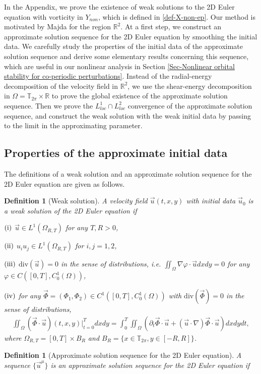 \documentclass[1 [leqno, 11pt]{amsart}
\numberwithin{equation}{section}
\newtheorem{definition}[Theorem]{Definition}
\begin{document}
\begin{CJK*}{GBK}{song}
\begin{appendix}
In the Appendix, we prove the existence of weak solutions to the 2D Euler equation with vorticity  in $Y_{non}$, which is defined in \eqref{def-X-non-ep}.
Our method is motivated by Majda \cite{DiPerna-Majda87,Majda-Bertozzi02} for the region $\mathbb{R}^2$.
 At a first step, we construct an approximate solution sequence for the 2D Euler equation by smoothing the initial data. We carefully study
 the properties of the initial data of the approximate solution sequence and derive some elementary results concerning this sequence, which are useful in our nonlinear analysis in Section \ref{Sec-Nonlinear orbital stability for co-periodic perturbations}.
 Instead of the radial-energy decomposition of the velocity field in $\mathbb{R}^2$,   we use the shear-energy decomposition in $\Omega=\mathbb{T}_{2\pi}\times\mathbb{R}$ to prove the global existence of the  approximate solution sequence.
Then we prove the $L_{loc}^1\cap L_{loc}^2$ convergence of the approximate solution sequence, and construct the weak solution with the weak initial data by passing to the limit in the approximating parameter.

\subsection{Properties of the approximate initial data}

The definitions of a  weak solution and an approximate solution sequence for the 2D Euler equation are given as follows.

\begin{definition}
[Weak solution] A velocity field $\vec{u}(t,x,y)$ with initial data $\vec{u}_0$ is a weak solution of the 2D Euler equation if

$(\rm{i})$ $\vec{u}\in L^1(\Omega_{R,T})$ for any $T, R>0$,

$(\rm{ii})$ $u_iu_j\in L^1(\Omega_{R,T})$ for $i,j=1,2$,

$(\rm{iii})$ $\text{div}(\vec{u})=0$ in the sense of distributions, i.e. $\iint_{\Omega}\nabla\varphi\cdot\vec{u} dxdy=0$ for any $\varphi\in C([0,T],C_0^1(\Omega))$,

$(\rm{iv})$ for any $\vec{\Phi}=(\Phi_1,\Phi_2)\in C^1([0,T], C_0^1(\Omega))$ with $\text{div}(\vec{\Phi})=0$ in the sense of distributions,
\begin{align*}
\iint_{\Omega} (\vec{\Phi}\cdot\vec{u})(t,x,y)|_{t=0}^T dxdy=\int_0^T\iint_{\Omega}\left(\partial_t\vec{\Phi}\cdot \vec{u}+(\vec{u}\cdot\nabla)\vec{\Phi}\cdot\vec{u}\right)dxdydt,
\end{align*}
where $\Omega_{R,T}=[0,T]\times B_R$ and $B_R=\{x\in\mathbb{T}_{2\pi},y\in[-R,R]\}$.
\end{definition}
\begin{definition} [Approximate solution sequence for the 2D Euler equation]
\label{Approximate solution sequence for the 2D Euler equation} A sequence $\{\vec{u}^\mu\}$  is an approximate solution sequence for the 2D Euler equation if


\end{definition}
\end{appendix}
\end{CJK*}
\end{document}
